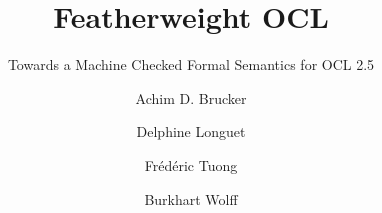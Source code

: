 \documentclass[11pt,a4paper,openright,twoside,abstracton]{scrreprt}
\begin{document}
\title{Featherweight OCL}
\subtitle{Towards a Machine Checked Formal Semantics for OCL 2.5}
\author{Achim D. Brucker\footnotemark[1] \and Delphine Longuet\footnotemark[2] \and
        Fr\'ed\'eric Tuong\footnotemark[3] \and Burkhart Wolff\footnotemark[2]}
\publishers{%
  \footnotemark[1]~SAP AG, Vincenz-Priessnitz-Str. 1, 76131 Karlsruhe,
  Germany \texorpdfstring{\\}{}
  \href{mailto:"Achim D. Brucker"
    <achim.brucker@sap.com>}{achim.brucker@sap.com}\\[2em]
  \footnotemark[2]~Univ. Paris-Sud, Laboratoire LRI, UMR8623, 91405 Orsay, France\\
  CNRS, 91405 Orsay, France\texorpdfstring{\\}{}
  \{delphine.longuet, burkhart.wolff\}@lri.fr\\[2em]
  \footnotemark[3]~Univ. Paris-Sud, IRT SystemX, 8 av. de la Vauve, 91120 Palaiseau, France\\
  frederic.tuong@\{u-psud, irt-systemx\}.fr
}


\maketitle
\end{document}
